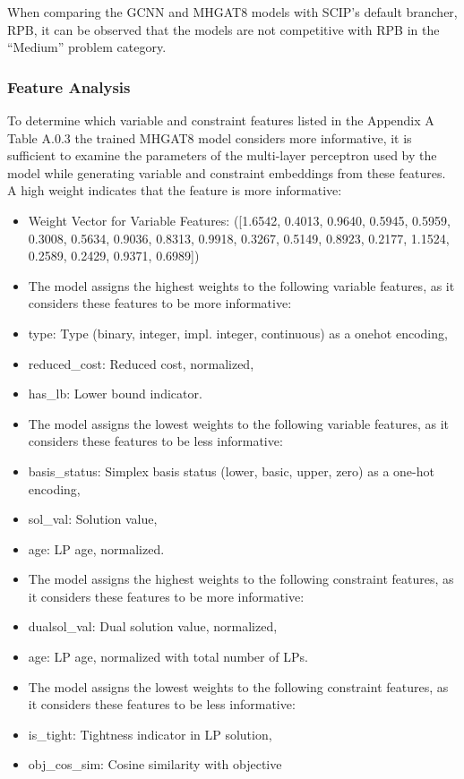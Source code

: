 When comparing the GCNN and MHGAT8 models with SCIP’s default brancher, RPB, it can be observed that the models are not competitive with RPB in the “Medium” problem category.




\subsubsection{Feature Analysis}
To determine which variable and constraint features listed in the Appendix A Table A.0.3 %
the trained MHGAT8 model considers more informative, it is sufficient to examine the parameters of the multi-layer perceptron used by the model while generating variable and constraint embeddings from these features.
A high weight indicates that the feature is more informative:


\begin{itemize}
  \item Weight Vector for Variable Features: ([1.6542, 0.4013, 0.9640, 0.5945, 0.5959, 0.3008, 0.5634, 0.9036, 0.8313, 0.9918, 0.3267, 0.5149, 0.8923, 0.2177, 1.1524, 0.2589, 0.2429, 0.9371, 0.6989])
  \item The model assigns the highest weights to the following variable features, as it considers these features to be more informative:
    \item type: Type (binary, integer, impl. integer, continuous) as a onehot encoding,
    \item reduced\_cost: Reduced cost, normalized,
    \item has\_lb: Lower bound indicator.
  \item The model assigns the lowest weights to the following variable features, as it considers these features to be less informative:
    \item basis\_status: Simplex basis status (lower, basic, upper, zero) as a one-hot encoding,
    \item sol\_val: Solution value,
    \item age: LP age, normalized.
  \item The model assigns the highest weights to the following constraint features, as it considers these features to be more informative:
    \item dualsol\_val: Dual solution value, normalized,
    \item age: LP age, normalized with total number of LPs.
  \item The model assigns the lowest weights to the following constraint features, as it considers these features to be less informative:
    \item is\_tight: Tightness indicator in LP solution,
    \item obj\_cos\_sim: Cosine similarity with objective
\end{itemize}
